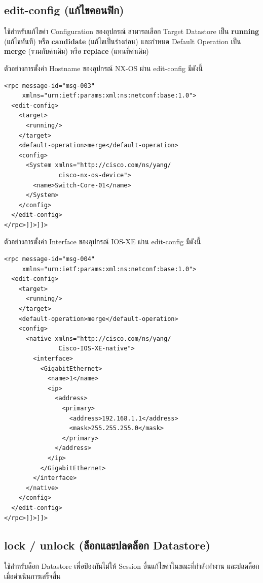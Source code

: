 \subsection{edit-config (แก้ไขคอนฟิก)}
\hspace*{1.3em}
ใช้สำหรับแก้ไขค่า Configuration ของอุปกรณ์ สามารถเลือก Target Datastore เป็น \textbf{running} (แก้ไขทันที) หรือ \textbf{candidate} (แก้ไขเป็นร่างก่อน) และกำหนด Default Operation เป็น \textbf{merge} (รวมกับค่าเดิม) หรือ \textbf{replace} (แทนที่ค่าเดิม)

\hspace*{1.3em}
ตัวอย่างการตั้งค่า Hostname ของอุปกรณ์ NX-OS ผ่าน edit-config มีดังนี้

\begin{verbatim}
<rpc message-id="msg-003"
     xmlns="urn:ietf:params:xml:ns:netconf:base:1.0">
  <edit-config>
    <target>
      <running/>
    </target>
    <default-operation>merge</default-operation>
    <config>
      <System xmlns="http://cisco.com/ns/yang/
               cisco-nx-os-device">
        <name>Switch-Core-01</name>
      </System>
    </config>
  </edit-config>
</rpc>]]>]]>
\end{verbatim}

\hspace*{1.3em}
ตัวอย่างการตั้งค่า Interface ของอุปกรณ์ IOS-XE ผ่าน edit-config มีดังนี้

\begin{verbatim}
<rpc message-id="msg-004"
     xmlns="urn:ietf:params:xml:ns:netconf:base:1.0">
  <edit-config>
    <target>
      <running/>
    </target>
    <default-operation>merge</default-operation>
    <config>
      <native xmlns="http://cisco.com/ns/yang/
               Cisco-IOS-XE-native">
        <interface>
          <GigabitEthernet>
            <name>1</name>
            <ip>
              <address>
                <primary>
                  <address>192.168.1.1</address>
                  <mask>255.255.255.0</mask>
                </primary>
              </address>
            </ip>
          </GigabitEthernet>
        </interface>
      </native>
    </config>
  </edit-config>
</rpc>]]>]]>
\end{verbatim}

\subsection{lock / unlock (ล็อกและปลดล็อก Datastore)}
\hspace*{1.3em}
ใช้สำหรับล็อก Datastore เพื่อป้องกันไม่ให้ Session อื่นแก้ไขค่าในขณะที่กำลังทำงาน และปลดล็อกเมื่อดำเนินการเสร็จสิ้น

